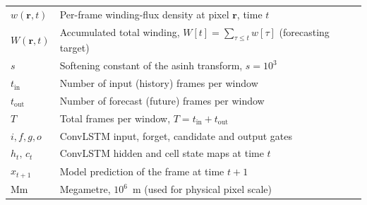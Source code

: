 \noindent
\begin{tabular}{l p{}}
$w(\mathbf{r},t)$ & Per-frame winding-flux density at pixel $\mathbf{r}$, time $t$ \\
$W(\mathbf{r},t)$ & Accumulated total winding, $W[t]=\sum_{\tau\le t} w[\tau]$ (forecasting target) \\
$s$               & Softening constant of the asinh transform, $s=10^{3}$ \\
$t_{\text{in}}$   & Number of input (history) frames per window \\
$t_{\text{out}}$  & Number of forecast (future) frames per window \\
$T$               & Total frames per window, $T=t_{\text{in}}+t_{\text{out}}$ \\
$i,f,g,o$         & ConvLSTM input, forget, candidate and output gates \\
$h_t,\,c_t$       & ConvLSTM hidden and cell state maps at time $t$ \\
$\hat{x}_{t+1}$   & Model prediction of the frame at time $t{+}1$ \\
$\mathrm{Mm}$     & Megametre, $10^{6}$~m (used for physical pixel scale) \\
\end{tabular}
